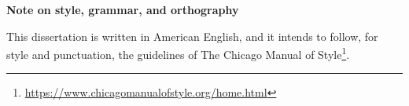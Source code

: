 
\cleardoublepage\thispagestyle{plain}

\textbf{\Large Note on style, grammar, and orthography}

This dissertation is written in American English, and it intends to follow, for style and punctuation, the guidelines of The Chicago Manual of Style\footnote{\url{https://www.chicagomanualofstyle.org/home.html}}.
